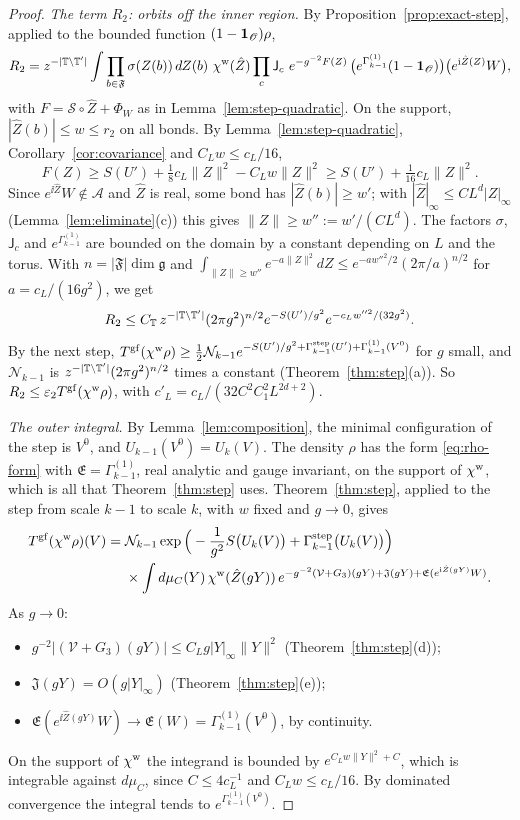 \begin{proof}
\emph{The term $R_2$: orbits off the inner region.} By Proposition~\ref{prop:exact-step}, applied to the bounded function $(1-\mathbf 1_{\mathscr O})\rho$,
\[
R_2=z^{-|\T\setminus\T'|}\int\prod_{b\in\mathfrak F}\sigma(Z(b))\,dZ(b)\ \chi^{\rm w}(\hat Z)\prod_c\mathsf J_c\ e^{-g^{-2}F(Z)}\,\big(e^{\Gamma^{(1)}_{k-1}}(1-\one_{\mathscr O})\big)\big(e^{\ii\hat Z(Z)}W\big),
\]
with $F=\mathcal S\circ\hat Z+\Phi_W$ as in Lemma~\ref{lem:step-quadratic}. On the support, $|\hat Z(b)|\le w\le r_2$ on all bonds. By Lemma~\ref{lem:step-quadratic}, Corollary~\ref{cor:covariance} and $C_Lw\le c_L/16$,
\[
F(Z)\ge S(U')+\tfrac18c_L\|Z\|^2-C_Lw\|Z\|^2\ge S(U')+\tfrac1{16}c_L\|Z\|^2 .
\]
Since $e^{\ii\hat Z}W\notin\mathscr A$ and $\hat Z$ is real, some bond has $|\hat Z(b)|\ge w'$; with $|\hat Z|_\infty\le CL^d|Z|_\infty$ (Lemma~\ref{lem:eliminate}(c)) this gives $\|Z\|\ge w'':=w'/(CL^d)$. The factors $\sigma$, $\mathsf J_c$ and $e^{\Gamma^{(1)}_{k-1}}$ are bounded on the domain by a constant depending on $L$ and the torus. With $n=|\mathfrak F|\dim\mathfrak g$ and $\int_{\|Z\|\ge w''}e^{-a\|Z\|^2}dZ\le e^{-aw''^2/2}(2\pi/a)^{n/2}$ for $a=c_L/(16g^2)$, we get
\[
R_2\le C_\mathbb T\,z^{-|\mathbb T\setminus\mathbb T'|}(2\pi g^2)^{n/2}e^{-S(U')/g^2}e^{-c_Lw''^2/(32g^2)} .
\]
By the next step, $T^{\rm gf}(\chi^{\rm w}\rho)\ge\frac12\mathcal N_{k-1}e^{-S(U')/g^2+\Gamma^{\rm step}_{k-1}(U')+\Gamma^{(1)}_{k-1}(V^0)}$ for $g$ small, and $\mathcal N_{k-1}$ is $z^{-|\mathbb T\setminus\mathbb T'|}(2\pi g^2)^{n/2}$ times a constant (Theorem~\ref{thm:step}(a)). So $R_2\le\varepsilon_2T^{\rm gf}(\chi^{\rm w}\rho)$, with $c'_L=c_L/(32C^2C_1^2L^{2d+2})$.

\emph{The outer integral.} By Lemma~\ref{lem:composition}, the minimal configuration of the step is $V^0$, and $U_{k-1}(V^0)=U_k(V)$. The density $\rho$ has the form \eqref{eq:rho-form} with $\mathfrak E=\Gamma^{(1)}_{k-1}$, real analytic and gauge invariant, on the support of $\chi^{\rm w}$, which is all that Theorem~\ref{thm:step} uses. Theorem~\ref{thm:step}, applied to the step from scale $k-1$ to scale $k$, with $w$ fixed and $g\to0$, gives
\[
\begin{aligned}
T^{\rm gf}(\chi^{\rm w}\rho)(V)={}&\mathcal N_{k-1}\exp\Big(-\frac1{g^2}S\big(U_k(V)\big)+\Gamma^{\rm step}_{k-1}\big(U_k(V)\big)\Big)\\
&\times\int d\mu_{C}(Y)\,\chi^{\rm w}(\hat Z(gY))\,e^{-g^{-2}(\mathcal V+G_3)(gY)+\mathfrak J(gY)+\mathfrak E(e^{\mathrm i\hat Z(gY)}W)} .
\end{aligned}
\]
As $g\to0$:
\begin{itemize}
\item $g^{-2}|(\mathcal V+G_3)(gY)|\le C_Lg|Y|_\infty\|Y\|^2$ (Theorem~\ref{thm:step}(d));
\item $\mathfrak J(gY)=O(g|Y|_\infty)$ (Theorem~\ref{thm:step}(e));
\item $\mathfrak E(e^{\ii\hat Z(gY)}W)\to\mathfrak E(W)=\Gamma^{(1)}_{k-1}(V^0)$, by continuity.
\end{itemize}
On the support of $\chi^{\rm w}$ the integrand is bounded by $e^{C_Lw\|Y\|^2+C}$, which is integrable against $d\mu_C$, since $C\le4c_L^{-1}$ and $C_Lw\le c_L/16$. By dominated convergence the integral tends to $e^{\Gamma^{(1)}_{k-1}(V^0)}$.


\end{proof}
